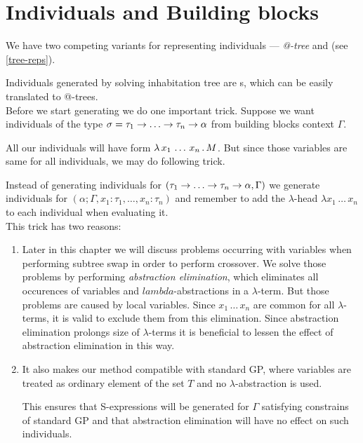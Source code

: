 \documentclass[12pt,a4paper]{report}
\makeatletter
\newcommand{\lterm}{$\lambda$-term\xspace}
\newcommand{\lterms}{$\lambda$-terms\xspace}
\newcommand{\atTree}{@-tree\xspace}
\newcommand{\lh}[1]{\lambda #1}
\makeatother
\begin{document}
\section{Individuals and Building blocks}

We have two competing variants for representing individuals ---
\textit{\atTree} and \mbox{\textit{\sexprTree}} (see \ref{tree-reps}).

Individuals generated by solving inhabitation tree 
are \sexprTree{}s, which can be easily translated to \atTree{}s. \\


Before we start generating we do one important trick.
Suppose we want individuals of the type 
$\sigma = \tau_1 \ar \dots \ar \tau_n \ar \alpha$
from building blocks context $\Gamma$.

All our individuals will have form $\lambda \, x_1\,\dots\,x_n \, . \, M$.
But since those variables are same for all individuals, 
we may do following trick.

Instead of generating individuals for
$(\tau_1 \ar \dots \ar \tau_n \ar \alpha,\Gamma)$
we generate individuals for $(\alpha;\Gamma,x_1:\tau_1,\dots,x_n:\tau_n)$
and remember to add the $\lambda$-head $\lh{x_1\,\dots\,x_n}$ to
each individual when evaluating it.\\

This trick has two reasons:
\begin{enumerate}
 \item Later in this chapter we will discuss problems occurring with variables
       when performing subtree swap in order to perform crossover.
       We solve those problems by performing \textit{abstraction elimination},
       which eliminates all occurences of variables and $lambda$-abstractions
       in a \lterm. But those problems are caused by local variables. 
       Since $x_1\,\dots\,x_n$ are common for all \lterms, it is valid
       to exclude them from this elimination. Since abstraction elimination
       prolongs size of \lterms it is beneficial to lessen 
       the effect of abstraction elimination in this way. 
        
 \item It also makes our method compatible with standard GP, where
       variables are treated as ordinary element of the set $T$
       and no $\lambda$-abstraction is used.
       
       This ensures that S-expressions will be generated for
       $\Gamma$ satisfying constrains of standard GP and that
       abstraction elimination will have no effect on such individuals.
\end{enumerate}
\end{document}
